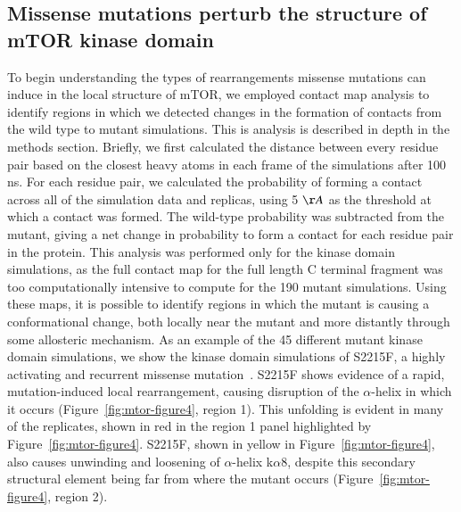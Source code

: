 \documentclass[phd,tocprelim]{cornell}
\begin{document}
\subsection{Missense mutations perturb the structure of mTOR kinase domain}
To begin understanding the types of rearrangements missense mutations can induce in the local structure of mTOR, we employed contact map analysis to identify regions in which we detected changes in the formation of contacts from the wild type to mutant simulations. This is analysis is described in depth in the methods section. Briefly, we first calculated the distance between every residue pair based on the closest heavy atoms in each frame of the simulations after 100 ns. For each residue pair, we calculated the probability of forming a contact across all of the simulation data and replicas, using 5 $\AA$ as the threshold at which a contact was formed. The wild-type probability was subtracted from the mutant, giving a net change in probability to form a contact for each residue pair in the protein. This analysis was performed only for the kinase domain simulations, as the full contact map for the full length C terminal fragment was too computationally intensive to compute for the 190 mutant simulations. Using these maps, it is possible to identify regions in which the mutant is causing a conformational change, both locally near the mutant and more distantly through some allosteric mechanism. As an example of the 45 different mutant kinase domain simulations, we show the kinase domain simulations of S2215F, a highly activating and recurrent missense mutation~\citep{Xu:2016fwu}. S2215F shows evidence of a rapid, mutation-induced local rearrangement, causing disruption of the $\alpha$-helix in which it occurs (Figure~\ref{fig:mtor-figure4}, region 1). This unfolding is evident in many of the replicates, shown in red in the region 1 panel highlighted by Figure~\ref{fig:mtor-figure4}. S2215F, shown in yellow in Figure~\ref{fig:mtor-figure4}, also causes unwinding and loosening of $\alpha$-helix k$\alpha$8, despite this secondary structural element being far from where the mutant occurs (Figure~\ref{fig:mtor-figure4}, region 2). 
\end{document}

